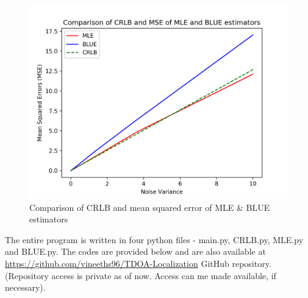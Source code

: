 \documentclass[a4 paper]{article}
\begin{document}
\newpage
{}

\vspace{6em}

\begin{figure}[h]
	\includegraphics[width=\linewidth]{../results/MSE.png}
	\caption{Comparison of CRLB and mean squared error of MLE \& BLUE estimators}
	\label{fig:MSE}
\end{figure}





\newpage
{}
\solution The entire program is written in four python files - main.py, CRLB.py, MLE.py and BLUE.py. The codes are provided below and are also available at \url{https://github.com/vineeths96/TDOA-Localization} GitHub repository. (Repository access is private as of now. Access can me made available, if necessary).

\inputminted[frame=lines, framesep=2mm, baselinestretch=1.2, fontsize=\footnotesize, linenos]{python}{../main.py}


\newpage
{}
\inputminted[frame=lines, framesep=2mm, baselinestretch=1.2, fontsize=\footnotesize, linenos]{python}{../CRLB.py}


\newpage
{}
\inputminted[frame=lines, framesep=2mm, baselinestretch=1.2, fontsize=\footnotesize, linenos]{python}{../MLE.py}


\newpage
{}
\inputminted[frame=lines, framesep=2mm, baselinestretch=1.2, fontsize=\footnotesize, linenos]{python}{../BLUE.py}
\end{document}
